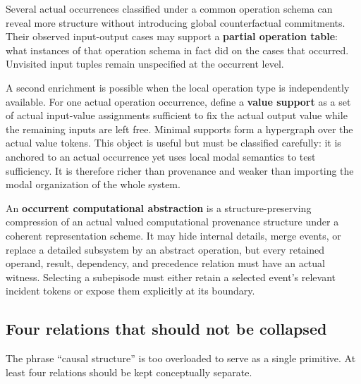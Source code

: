 \documentclass[11pt,a4paper]{article}
\begin{document}
Several actual occurrences classified under a common operation schema can reveal more structure without introducing global counterfactual commitments. Their observed input-output cases may support a \textbf{partial operation table}: what instances of that operation schema in fact did on the cases that occurred. Unvisited input tuples remain unspecified at the occurrent level.

A second enrichment is possible when the local operation type is independently available. For one actual operation occurrence, define a \textbf{value support} as a set of actual input-value assignments sufficient to fix the actual output value while the remaining inputs are left free. Minimal supports form a hypergraph over the actual value tokens. This object is useful but must be classified carefully: it is anchored to an actual occurrence yet uses local modal semantics to test sufficiency. It is therefore richer than provenance and weaker than importing the modal organization of the whole system.

\begin{definitionbox}
An \textbf{occurrent computational abstraction} is a structure-preserving compression of an actual valued computational provenance structure under a coherent representation scheme. It may hide internal details, merge events, or replace a detailed subsystem by an abstract operation, but every retained operand, result, dependency, and precedence relation must have an actual witness. Selecting a subepisode must either retain a selected event's relevant incident tokens or expose them explicitly at its boundary.
\end{definitionbox}

\subsection{Four relations that should not be collapsed}

The phrase ``causal structure'' is too overloaded to serve as a single primitive. At least four relations should be kept conceptually separate.
\end{document}
